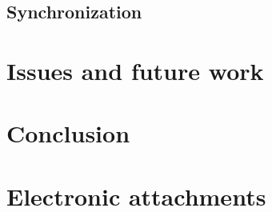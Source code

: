 \documentclass[
  digital,     %
  color,       %
  oneside,     %
  nosansbold,  %
  nocolorbold, %
  lof,         %
  lot,         %
]{fithesis4}
\begin{document}
\section{Synchronization}

\chapter{Issues and future work}

\chapter*{Conclusion}

\setcounter{biburllcpenalty}{7000}
\setcounter{biburlucpenalty}{8000}
\printbibliography[heading=bibintoc] %

\appendix %
\chapter{Electronic attachments}
\end{document}
